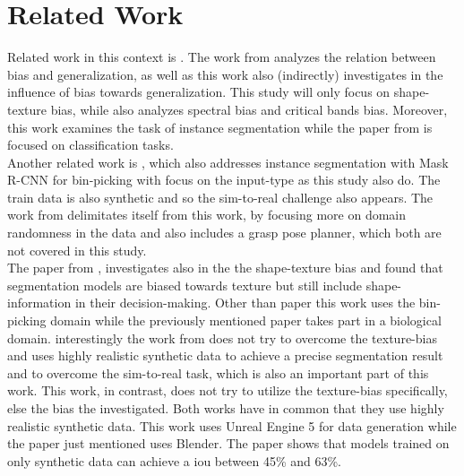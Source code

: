 	\clearpage
	\section{Related Work}
	\label{sec:related-work}
		Related work in this context is  \cite{Gavrikov2024}. The work from \citeauthor{Gavrikov2024} analyzes the relation between bias and generalization, as well as this work also (indirectly) investigates in the influence of bias towards generalization. This study will only focus on shape-texture bias, while  also analyzes spectral bias and critical bands bias. Moreover, this work examines the task of instance segmentation while the paper from \citeauthor{Gavrikov2024} is focused on classification tasks.\\
		Another related work is  \cite{Raj2023}, which also addresses instance segmentation with Mask R-CNN for bin-picking with focus on the input-type as this study also do. The train data is also synthetic and so the sim-to-real challenge also appears. The work from \citeauthor{Raj2023} delimitates itself from this work, by focusing more on domain randomness in the data and also includes a grasp pose planner, which both are not covered in this study.\\
		The paper  from \citeauthor{Tabak2023} \cite{Tabak2023}, investigates also in the the shape-texture bias and found that segmentation models are biased towards texture but still include shape-information in their decision-making. Other than paper \cite{Tabak2023} this work uses the bin-picking domain while the previously mentioned paper takes part in a biological domain. interestingly the work from \citeauthor{Tabak2023} does not try to overcome the texture-bias and uses highly realistic synthetic data to achieve a precise segmentation result and to overcome the sim-to-real task, which is also an important part of this work. This work, in contrast, does not try to utilize the texture-bias specifically, else the bias the investigated. Both works have in common that they use highly realistic synthetic data. This work uses Unreal Engine 5 for data generation while the paper just mentioned uses Blender. The paper shows that models trained on only synthetic data can achieve a \ac{iou} between 45\% and 63\%.\\
